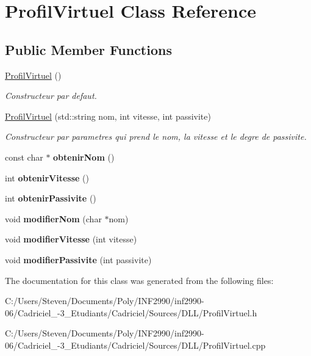 \hypertarget{class_profil_virtuel}{}\section{Profil\+Virtuel Class Reference}
\label{class_profil_virtuel}
\subsection*{Public Member Functions}
\begin{DoxyCompactItemize}
\item 
\hyperlink{group__inf2990_ga0d0539c487d998663383f6fee4005e56}{Profil\+Virtuel} ()
\begin{DoxyCompactList}\small\item\em Constructeur par defaut. \end{DoxyCompactList}\item 
\hyperlink{group__inf2990_gab78b313efeeb5d5e15a37e6eff294858}{Profil\+Virtuel} (std\+::string nom, int vitesse, int passivite)
\begin{DoxyCompactList}\small\item\em Constructeur par parametres qui prend le nom, la vitesse et le degre de passivite. \end{DoxyCompactList}\item 
const char $\ast$ {\bfseries obtenir\+Nom} ()
\item 
int {\bfseries obtenir\+Vitesse} ()
\item 
int {\bfseries obtenir\+Passivite} ()
\item 
void {\bfseries modifier\+Nom} (char $\ast$nom)
\item 
void {\bfseries modifier\+Vitesse} (int vitesse)
\item 
void {\bfseries modifier\+Passivite} (int passivite)
\end{DoxyCompactItemize}


The documentation for this class was generated from the following files\+:\begin{DoxyCompactItemize}
\item 
C\+:/\+Users/\+Steven/\+Documents/\+Poly/\+I\+N\+F2990/inf2990-\/06/\+Cadriciel\+\_-\/3\+\_\+\+Etudiants/\+Cadriciel/\+Sources/\+D\+L\+L/Profil\+Virtuel.\+h\item 
C\+:/\+Users/\+Steven/\+Documents/\+Poly/\+I\+N\+F2990/inf2990-\/06/\+Cadriciel\+\_-\/3\+\_\+\+Etudiants/\+Cadriciel/\+Sources/\+D\+L\+L/Profil\+Virtuel.\+cpp\end{DoxyCompactItemize}
